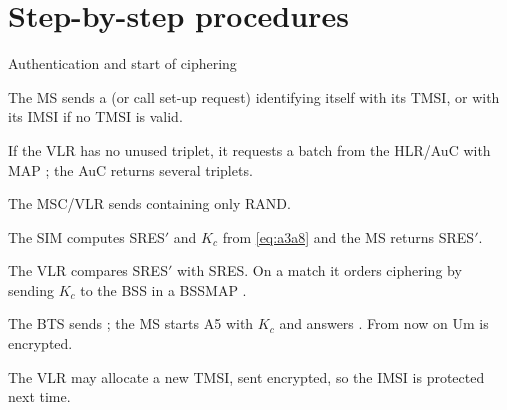 \documentclass[11pt,a4paper]{article}
\begin{document}
\begin{acnfigure}
  \caption{GSM network with the GPRS overlay. Solid grey: transport links;
  teal: packet-switched links; dashed blue: MAP signalling towards the HLR and EIR.}
  \label{fig:arch}
\end{acnfigure}

\begin{acnfigure}
  \caption{GSM time structure. A 26-multiframe (\qty{120}{\milli\second}) contains 24
  traffic frames, one SACCH frame and one idle frame; each TDMA frame contains eight
  timeslots; a normal burst carries 114 data bits.}
  \label{fig:tdma}
\end{acnfigure}

\section{Step-by-step procedures}\label{sec:procedures}

\begin{procedurebox}{Authentication and start of ciphering}\label{proc:auth}
\begin{steps}
  \item The MS sends a  (or call set-up request)
        identifying itself with its TMSI, or with its IMSI if no TMSI is valid.
  \item If the VLR has no unused triplet, it requests a batch from the HLR/AuC with MAP
        ; the AuC returns several triplets.
  \item The MSC/VLR sends  containing only RAND.
  \item The SIM computes SRES$'$ and $K_c$ from \cref{eq:a3a8} and the MS returns SRES$'$.
  \item The VLR compares SRES$'$ with SRES. On a match it orders ciphering by sending
        $K_c$ to the BSS in a BSSMAP .
  \item The BTS sends ; the MS starts A5 with $K_c$ and
        answers . From now on Um is encrypted.
  \item The VLR may allocate a new TMSI, sent encrypted, so the IMSI is protected next time.
\end{steps}
\end{procedurebox}
\end{document}
